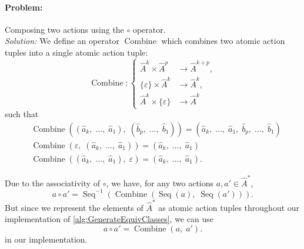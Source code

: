 \paragraph{Problem:}
Composing two actions using the $\circ$ operator.
\\\textit{Solution:}
We define an operator $\operatorname{Combine}$ which combines two atomic action tuples into a single atomic action tuple:
\begin{equation}
    \operatorname{Combine} : \begin{cases}
       \hat{A}^{k} \times \hat{A}^{p} & \to \hat{A}^{k+p}, \\
        \{\varepsilon\} \times \hat{A}^{k} & \to \hat{A}^{k}, \\
        \hat{A}^{k} \times \{\varepsilon\} & \to \hat{A}^{k}
    \end{cases}
\end{equation}
such that
\begin{align}
    & \operatorname{Combine}((\hat{a}_{k}, \; \dots, \; \hat{a}_{1}), \; (\hat{b}_{p}, \; \dots, \; \hat{b}_{1})) = (\hat{a}_{k}, \; \dots, \; \hat{a}_{1}, \; \hat{b}_{p}, \; \dots, \; \hat{b}_{1}) \\
    & \operatorname{Combine}(\varepsilon, \; (\hat{a}_{k}, \; \dots, \; \hat{a}_{1})) = (\hat{a}_{k}, \; \dots, \; \hat{a}_{1}) \\
     & \operatorname{Combine}((\hat{a}_{k}, \; \dots, \; \hat{a}_{1}), \; \varepsilon) = (\hat{a}_{k}, \; \dots, \; \hat{a}_{1}).
\end{align}

Due to the associativity of $\circ$, we have, for any two actions $a, a' \in \hat{A}^{*}$,
\begin{equation}
	a \circ a' = \operatorname{Seq}^{-1}(\operatorname{Combine}(\operatorname{Seq}(a), \; \operatorname{Seq}(a'))).
\end{equation}
But since we represent the elements of $\hat{A}^{*}$ as atomic action tuples throughout our implementation of \cref{alg:GenerateEquivClasses}, we can use
\begin{equation}
	a \circ a' = \operatorname{Combine}(a, \; a').
\end{equation}
in our implementation.


